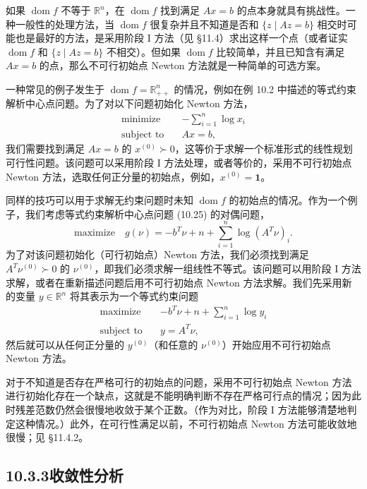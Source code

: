 \documentclass[UTF8,12pt,a4paper,fontset=fandol]{ctexart}
\begin{document}
如果 $\operatorname{dom} f$ 不等于 $\mathbb{R}^n$，在 $\operatorname{dom} f$ 找到满足 $Ax=b$ 的点本身就具有挑战性。一种一般性的处理方法，当 $\operatorname{dom} f$ 很复杂并且不知道是否和 $\{z\mid Az=b\}$ 相交时可能也是最好的方法，是采用阶段 I 方法（见 \S11.4）求出这样一个点（或者证实 $\operatorname{dom} f$ 和 $\{z\mid Az=b\}$ 不相交）。但如果 $\operatorname{dom} f$ 比较简单，并且已知含有满足 $Ax=b$ 的点，那么不可行初始点 Newton 方法就是一种简单的可选方案。

一种常见的例子发生于 $\operatorname{dom} f=\mathbb{R}_{++}^n$ 的情况，例如在例 10.2 中描述的等式约束解析中心点问题。为了对以下问题初始化 Newton 方法，
\begin{equation}
\begin{aligned}
\text{minimize}\quad & -\sum_{i=1}^n\log x_i\\
\text{subject to}\quad & Ax=b,
\end{aligned}
\tag{10.25}
\end{equation}
我们需要找到满足 $Ax=b$ 的 $x^{(0)}\succ 0$，这等价于求解一个标准形式的线性规划可行性问题。该问题可以采用阶段 I 方法处理，或者等价的，采用不可行初始点 Newton 方法，选取任何正分量的初始点，例如，$x^{(0)}=\mathbf{1}$。

同样的技巧可以用于求解无约束问题时未知 $\operatorname{dom} f$ 的初始点的情况。作为一个例子，我们考虑等式约束解析中心点问题 (10.25) 的对偶问题，
\[
\text{maximize}\quad g(\nu)=-b^T\nu+n+\sum_{i=1}^n\log(A^T\nu)_i.
\]
为了对该问题初始化（可行初始点）Newton 方法，我们必须找到满足 $A^T\nu^{(0)}\succ 0$ 的 $\nu^{(0)}$，即我们必须求解一组线性不等式。该问题可以用阶段 I 方法求解，或者在重新描述问题后用不可行初始点 Newton 方法求解。我们先采用新的变量 $y\in\mathbb{R}^n$ 将其表示为一个等式约束问题
\[
\begin{aligned}
\text{maximize}\quad & -b^T\nu+n+\sum_{i=1}^n\log y_i\\
\text{subject to}\quad & y=A^T\nu,
\end{aligned}
\]
然后就可以从任何正分量的 $y^{(0)}$（和任意的 $\nu^{(0)}$）开始应用不可行初始点 Newton 方法。

对于不知道是否存在严格可行的初始点的问题，采用不可行初始点 Newton 方法进行初始化存在一个缺点，这就是不能明确判断不存在严格可行点的情况；因为此时残差范数仍然会很慢地收敛于某个正数。（作为对比，阶段 I 方法能够清楚地判定这种情况。）此外，在可行性满足以前，不可行初始点 Newton 方法可能收敛地很慢；见 \S11.4.2。

\subsection*{10.3.3\quad 收敛性分析}
\end{document}

